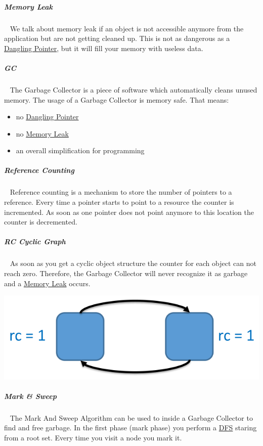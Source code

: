 \documentclass[11pt,twoside,landscape]{article}
\begin{document}
\begin{multicols}{3}
\subparagraph{Memory Leak} \
\label{sec:orgf4db414}
We talk about memory leak if an object is not accessible anymore from the application but are not getting cleaned up.
This is not as dangerous as a \href{../../../roam/20221230183145-what_is_a_dangling_pointer.org}{Dangling Pointer}, but it will fill your memory with useless data.

\subparagraph{GC} \
\label{sec:orgcf2676c}
The Garbage Collector is a piece of software which automatically cleans unused memory.
The usage of a Garbage Collector is memory safe.
That means:
\begin{itemize}
\item no \href{../../../roam/20221230183145-what_is_a_dangling_pointer.org}{Dangling Pointer}
\item no \href{../../../roam/20221230183215-what_is_a_memory_leak.org}{Memory Leak}
\item an overall simplification for programming
\end{itemize}

\subparagraph{Reference Counting} \
\label{sec:org8455dfb}
Reference counting is a mechanism to store the number of pointers to a reference.
Every time a pointer starts to point to a resource the counter is incremented.
As soon as one pointer does not point anymore to this location the counter is decremented.

\subparagraph{RC Cyclic Graph} \
\label{sec:orgec23ce9}
As soon as you get a cyclic object structure the counter for each object can not reach zero.
Therefore, the Garbage Collector will never recognize it as garbage and a \href{../../../roam/20221230183215-what_is_a_memory_leak.org}{Memory Leak} occurs.


{
\begin{center}
\includegraphics[width=.9\linewidth]{img/cyclic_object_structure.png}
\end{center}
\label{fig:cyclic-object-structure}
}

\subparagraph{Mark \& Sweep} \
\label{sec:orgdc7666f}
The Mark And Sweep Algorithm can be used to inside a Garbage Collector to find and free garbage.
In the first phase (mark phase) you perform a \href{../../../roam/20220202095038-dfs.org}{DFS} staring from a root set.
Every time you visit a node you mark it.


\end{multicols}
\end{document}

